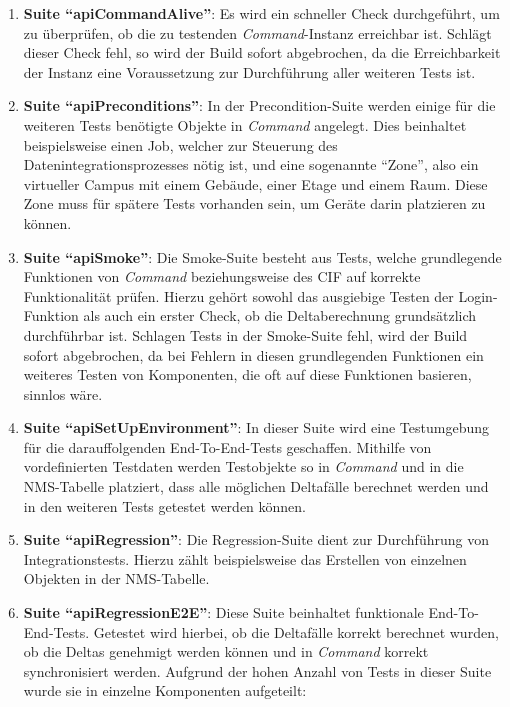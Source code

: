 \begin{enumerate}
    \item \textbf{Suite \enquote{apiCommandAlive}}: Es wird ein schneller Check durchgeführt, um zu überprüfen, ob die zu testenden \textit{Command}-Instanz erreichbar ist. Schlägt dieser Check fehl, so wird der Build sofort abgebrochen, da die Erreichbarkeit der Instanz eine Voraussetzung zur Durchführung aller weiteren Tests ist.
    \item \textbf{Suite \enquote{apiPreconditions}}: In der Precondition-Suite werden einige für die weiteren Tests benötigte Objekte in \textit{Command} angelegt. Dies beinhaltet beispielsweise einen Job, welcher zur Steuerung des Datenintegrationsprozesses nötig ist, und eine sogenannte \enquote{Zone}, also ein virtueller Campus mit einem Gebäude, einer Etage und einem Raum. Diese Zone muss für spätere Tests vorhanden sein, um Geräte darin platzieren zu können.
    \item \textbf{Suite \enquote{apiSmoke}}: Die Smoke-Suite besteht aus Tests, welche grundlegende Funktionen von \textit{Command} beziehungsweise des \ac{CIF} auf korrekte Funktionalität prüfen. Hierzu gehört sowohl das ausgiebige Testen der Login-Funktion als auch ein erster Check, ob die Deltaberechnung grundsätzlich durchführbar ist. Schlagen Tests in der Smoke-Suite fehl, wird der Build sofort abgebrochen, da bei Fehlern in diesen grundlegenden Funktionen ein weiteres Testen von Komponenten, die oft auf diese Funktionen basieren, sinnlos wäre.
    \item \textbf{Suite \enquote{apiSetUpEnvironment}}: In dieser Suite wird eine Testumgebung für die darauffolgenden End-To-End-Tests geschaffen. Mithilfe von vordefinierten Testdaten werden Testobjekte so in \textit{Command} und in die \ac{NMS}-Tabelle platziert, dass alle möglichen Deltafälle berechnet werden und in den weiteren Tests getestet werden können.
    \item \textbf{Suite \enquote{apiRegression}}: Die Regression-Suite dient zur Durchführung von Integrationstests. Hierzu zählt beispielsweise das Erstellen von einzelnen Objekten in der \ac{NMS}-Tabelle.
    \item \textbf{Suite \enquote{apiRegressionE2E}}: Diese Suite beinhaltet funktionale End-To-End-Tests. Getestet wird hierbei, ob die Deltafälle korrekt berechnet wurden, ob die Deltas genehmigt werden können und in \textit{Command} korrekt synchronisiert werden. Aufgrund der hohen Anzahl von Tests in dieser Suite wurde sie in einzelne Komponenten aufgeteilt:
    \begin{description}

\end{description}
\end{enumerate}
